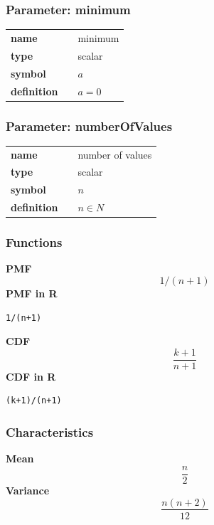 \subsubsection*{Parameter: minimum}

\noindent\begin{tabular}{p{2cm}cl}
\textbf{name} & & minimum \\
\textbf{type} & & scalar \\
\textbf{symbol} & & $a$  \\
\textbf{definition} & & $a=0$
\end{tabular}
\subsubsection*{Parameter: numberOfValues}

\noindent\begin{tabular}{p{2cm}cl}
\textbf{name} & & number of values \\
\textbf{type} & & scalar \\
\textbf{symbol} & & $n$  \\
\textbf{definition} & & $n \in N$
\end{tabular}
\subsubsection*{Functions}

\smallskip \noindent \hspace{.2cm} \textbf{PMF} 
\begin{equation*}1/(n+1)\end{equation*}
\smallskip \noindent \hspace{.2cm} \textbf{PMF in R}  
\begin{verbatim}1/(n+1)\end{verbatim}
\smallskip \noindent \hspace{.2cm} \textbf{CDF} 
\begin{equation*}\frac{k+1}{n+1}\end{equation*}
\smallskip \noindent \hspace{.2cm} \textbf{CDF in R} 
\begin{verbatim}(k+1)/(n+1)\end{verbatim}
\smallskip
\subsubsection*{Characteristics}
\smallskip \noindent \hspace{.2cm} \textbf{Mean} 
\begin{equation*}\frac{n}{2}\end{equation*}
\smallskip \noindent \hspace{.2cm} \textbf{Variance} 
\begin{equation*}\frac{n(n+2)}{12}\end{equation*}
\smallskip
